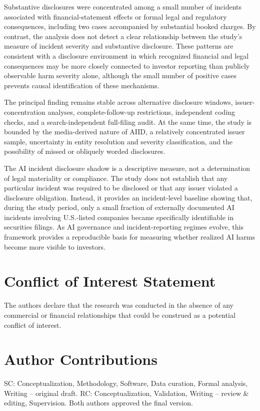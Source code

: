 \documentclass[utf8]{FrontiersinHarvard}
\begin{document}
Substantive disclosures were concentrated among a small number of incidents associated with financial-statement effects or formal legal and regulatory consequences, including two cases accompanied by substantial booked charges. By contrast, the analysis does not detect a clear relationship between the study's measure of incident severity and substantive disclosure. These patterns are consistent with a disclosure environment in which recognized financial and legal consequences may be more closely connected to investor reporting than publicly observable harm severity alone, although the small number of positive cases prevents causal identification of these mechanisms.

The principal finding remains stable across alternative disclosure windows, issuer-concentration analyses, complete-follow-up restrictions, independent coding checks, and a search-independent full-filing audit. At the same time, the study is bounded by the media-derived nature of AIID, a relatively concentrated issuer sample, uncertainty in entity resolution and severity classification, and the possibility of missed or obliquely worded disclosures.

The AI incident disclosure shadow is a descriptive measure, not a determination of legal materiality or compliance. The study does not establish that any particular incident was required to be disclosed or that any issuer violated a disclosure obligation. Instead, it provides an incident-level baseline showing that, during the study period, only a small fraction of externally documented AI incidents involving U.S.-listed companies became specifically identifiable in securities filings. As AI governance and incident-reporting regimes evolve, this framework provides a reproducible basis for measuring whether realized AI harms become more visible to investors.

\section*{Conflict of Interest Statement}
The authors declare that the research was conducted in the absence of any commercial or financial relationships that could be construed as a potential conflict of interest.

\section*{Author Contributions}
SC: Conceptualization, Methodology, Software, Data curation, Formal analysis, Writing -- original draft. RC: Conceptualization, Validation, Writing -- review \& editing, Supervision. Both authors approved the final version.
\end{document}
